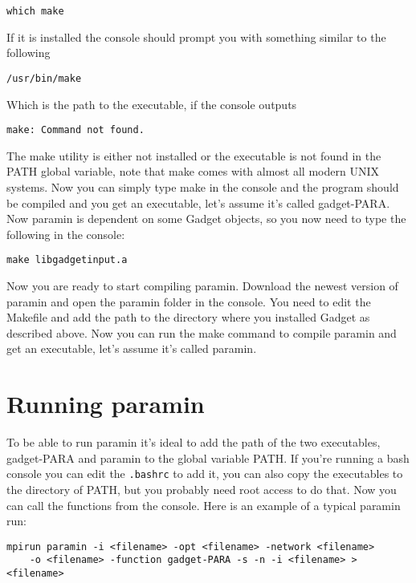 \documentclass[10pt,twoside]{book}
\begin{document}
{\small\begin{verbatim}
which make
\end{verbatim}}
If it is installed the console should prompt you with something similar to the following

{\small\begin{verbatim}
/usr/bin/make
\end{verbatim}}

Which is the path to the executable, if the console outputs
{\small\begin{verbatim}
make: Command not found.
\end{verbatim}}

The make utility is either not installed or the executable is not found in the PATH global variable, note that make comes with almost all modern UNIX 
systems. Now you can simply type make in the console and the program should be compiled and you get an executable, let's assume it's called gadget-PARA. Now 
paramin is dependent on some Gadget objects, so you now need to type the following in the console:

{\small\begin{verbatim}
make libgadgetinput.a
\end{verbatim}}

Now you are ready to start compiling paramin. Download the newest version of paramin and open the paramin folder in the console. You need to edit the
Makefile and add the path to the directory where you installed Gadget as described above. Now you can run the make command to compile paramin and get
an executable, let's assume it's called paramin.

\section{Running paramin}\label{sec:runparamin}
To be able to run paramin it's ideal to add the path of the two executables, gadget-PARA and paramin to the global variable PATH. If you're running
a bash console you can edit the \texttt{.bashrc} to add it, you can also copy the executables to the directory of PATH, but you probably need root 
access to do that. Now you can call the functions from the console. Here is an example of a typical paramin run:

{\small\begin{verbatim}
mpirun paramin -i <filename> -opt <filename> -network <filename> 
	-o <filename> -function gadget-PARA -s -n -i <filename> > <filename>
\end{verbatim}}
\end{document}
